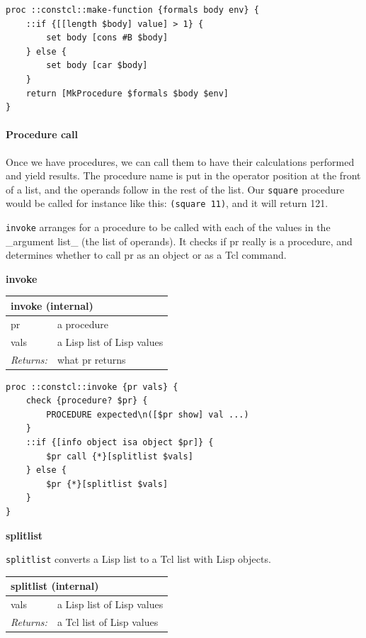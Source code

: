 \documentclass[twoside,9pt]{report}
\begin{document}
\noindent\makebox[\linewidth]{\rule{\linewidth}{0.4pt}}
\begin{lstlisting}
proc ::constcl::make-function {formals body env} {
    ::if {[[length $body] value] > 1} {
        set body [cons #B $body]
    } else {
        set body [car $body]
    }
    return [MkProcedure $formals $body $env]
}
\end{lstlisting}
\noindent\makebox[\linewidth]{\rule{\linewidth}{0.4pt}}
\paragraph{Procedure call}
\label{procedure-call}

Once we have procedures, we can call them to have their calculations performed and yield results. The procedure name is put in the operator position at the front of a list, and the operands follow in the rest of the list. Our \texttt{square} procedure would be called for instance like this: \texttt{(square 11)}, and it will return 121.


\texttt{invoke} arranges for a procedure to be called with each of the values in the \_argument list\_ (the list of operands). It checks if pr really is a procedure, and determines whether to call pr as an object or as a Tcl command.


\textbf{invoke}

\begin{tabular}{ |l l| }
\hline
\multicolumn{2}{|l|}{invoke (internal)} \\
\hline
pr & a procedure \\
vals & a Lisp list of Lisp values \\
\textit{Returns:} & what pr returns \\
\hline
\end{tabular}

\noindent\makebox[\linewidth]{\rule{\linewidth}{0.4pt}}
\begin{lstlisting}
proc ::constcl::invoke {pr vals} {
    check {procedure? $pr} {
        PROCEDURE expected\n([$pr show] val ...)
    }
    ::if {[info object isa object $pr]} {
        $pr call {*}[splitlist $vals]
    } else {
        $pr {*}[splitlist $vals]
    }
}
\end{lstlisting}
\noindent\makebox[\linewidth]{\rule{\linewidth}{0.4pt}}

\textbf{splitlist}


\texttt{splitlist} converts a Lisp list to a Tcl list with Lisp objects.

\begin{tabular}{ |l l| }
\hline
\multicolumn{2}{|l|}{splitlist (internal)} \\
\hline
vals & a Lisp list of Lisp values \\
\textit{Returns:} & a Tcl list of Lisp values \\
\hline
\end{tabular}
\end{document}
